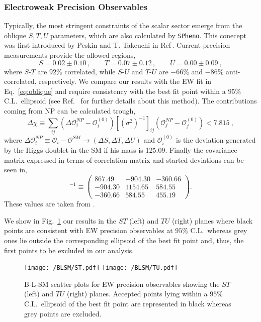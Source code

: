 \documentclass[10pt]{book}
\renewcommand{\(}{\left(}
\renewcommand{\)}{\right)}
\renewcommand{\[}{\left[}
\renewcommand{\]}{\right]}
\begin{document}
\subsubsection{Electroweak Precision Observables}
\label{Sec:B-L-SM-EW}
Typically, the most stringent constraints of the scalar sector emerge from the oblique $S,T,U$ parameters, which are also calculated by \texttt{SPheno}. 
%
This conecept was first introduced by Peskin and T. Takeuchi in Ref\,\cite{Peskin1992}.
%
Current precision measurements provide the allowed regions,
%
\begin{equation}
	S = 0.02 \pm 0.10\,, \qquad T = 0.07 \pm 0.12\,, \qquad U = 0.00 \pm 0.09 \ ,
	\label{eq:oblique}
\end{equation}
%
where $S$-$T$ are $92\%$ correlated, while $S$-$U$ and $T$-$U$ are $-66\%$ and $-86\%$ anti-correlated, respectively.
%
We compare our results with the EW fit in Eq.~\eqref{eq:oblique} and require consistency with the best fit point within a $95\%$ C.L.~ellipsoid (see Ref.~\cite{Costa:2014qga} for further details about this method). %
%
The contributions coming from NP can be calculated trough,
%
\begin{equation}
\Delta \chi \equiv \sum_{ij}  \left(  \Delta \mathcal{O}_{i}^{NP} - \mathcal{O}_{i}^{(0)} \right) [ ( \sigma^2 )^{-1} ]_{ij}  \left(  \mathcal{O}_{j}^{NP} - \mathcal{O}_{j}^{(0)}  \right) < 7.815 \ , 
\end{equation}
%
where $\Delta \mathcal{O}_i^{NP} \equiv \mathcal{O}_i - \mathcal{O}^{SM} \rightarrow (\Delta S , \Delta T , \Delta U )$ and $\mathcal{O}_i^{(0)}$ is the deviation generated by the Higgs doublet in the SM if his mass is 125.09. Finally the covariance matrix expressed in terms of correlation matrix and started deviations can be seen in, 
\begin{equation}
[ \sigma^2 ]^{-1} \equiv \begin{pmatrix}
867.49 & -904.30 & -360.66\\
-904.30 & 1154.65 & 584.55 \\
-360.66 & 584.55 &  455.19
\end{pmatrix} . 
\end{equation}
These values are taken from \cite{Baak_2012}. 

We show in Fig.~\ref{fig:STU} our results in the $ST$ (left) and $TU$ (right) planes where black points are consistent with EW precision observables at $95\%$ C.L.~whereas grey ones lie outside the corresponding ellipsoid of the best fit point and, thus, the first points to be excluded in our analysis. 
\begin{figure}[H]
	\centering
	\texttt{[image: /BLSM/ST.pdf]}
	\texttt{[image: /BLSM/TU.pdf]}
	\caption{B-L-SM scatter plots for EW precision observables showing the $ST$ (left) and $TU$ (right) planes. Accepted points lying within a $95\%$ C.L.~ellipsoid of the best fit point are represented in black whereas grey points are excluded.}
	\label{fig:STU}
\end{figure}	
\end{document}
